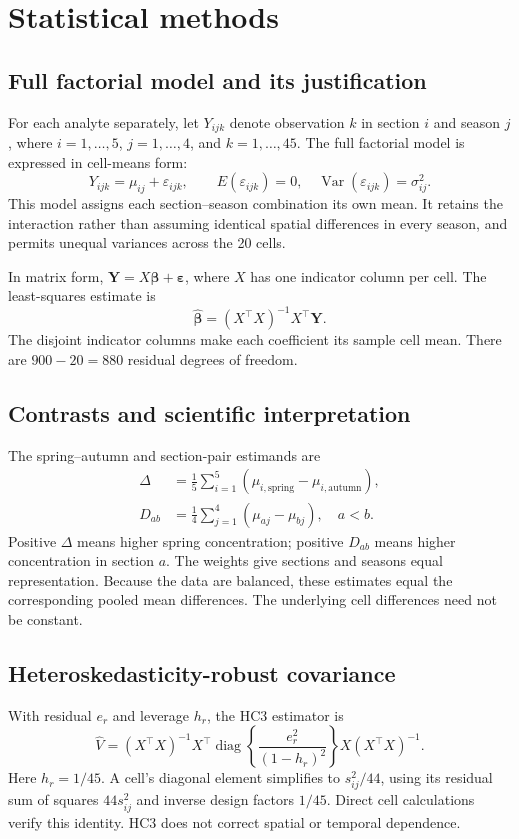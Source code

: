 \section{Statistical methods}\label{sec:methods}
\subsection{Full factorial model and its justification}
For each analyte separately, let $Y_{ijk}$ denote observation $k$ in section $i$ and season $j$, where $i=1,\ldots,5$, $j=1,\ldots,4$, and $k=1,\ldots,45$. The full factorial model is expressed in cell-means form:
\begin{equation}
Y_{ijk}=\mu_{ij}+\varepsilon_{ijk},\qquad
E(\varepsilon_{ijk})=0,\quad
\operatorname{Var}(\varepsilon_{ijk})=\sigma_{ij}^{2}.
\end{equation}
This model assigns each section--season combination its own mean. It retains the interaction rather than assuming identical spatial differences in every season, and permits unequal variances across the 20 cells.

In matrix form, $\mathbf Y=X\boldsymbol\beta+\boldsymbol\varepsilon$, where $X$ has one indicator column per cell. The least-squares estimate is
\begin{equation}
\widehat{\boldsymbol\beta}=(X^\top X)^{-1}X^\top\mathbf Y.
\end{equation}
The disjoint indicator columns make each coefficient its sample cell mean. There are $900-20=880$ residual degrees of freedom.

\subsection{Contrasts and scientific interpretation}
The spring--autumn and section-pair estimands are
\begin{align}
\Delta&=\frac15\sum_{i=1}^{5}
  (\mu_{i,\mathrm{spring}}-\mu_{i,\mathrm{autumn}}),\\
D_{ab}&=\frac14\sum_{j=1}^{4}(\mu_{aj}-\mu_{bj}),\quad a<b.
\end{align}
Positive $\Delta$ means higher spring concentration; positive $D_{ab}$ means higher concentration in section $a$. The weights give sections and seasons equal representation. Because the data are balanced, these estimates equal the corresponding pooled mean differences. The underlying cell differences need not be constant.

\subsection{Heteroskedasticity-robust covariance}
With residual $e_r$ and leverage $h_r$, the HC3 estimator is
\begin{equation}
\widehat V=(X^\top X)^{-1}X^\top
 \operatorname{diag}\!\left\{\frac{e_r^2}{(1-h_r)^2}\right\}
 X(X^\top X)^{-1}.
\end{equation}
Here $h_r=1/45$. A cell's diagonal element simplifies to $s_{ij}^2/44$, using its residual sum of squares $44s_{ij}^2$ and inverse design factors $1/45$. Direct cell calculations verify this identity. HC3 does not correct spatial or temporal dependence.
